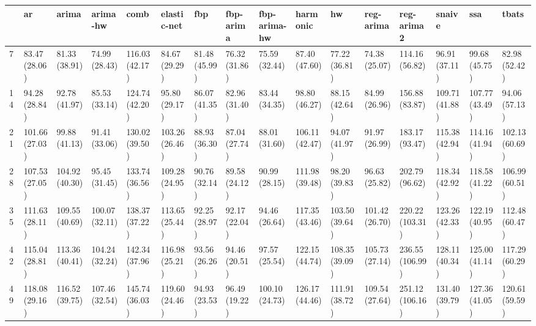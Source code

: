 \begin{tabular}{llllllllllllllll}
\toprule
{} &              ar &           arima &        arima-hw &            comb &     elastic-net &             fbp &       fbp-arima &    fbp-arima-hw &        harmonic &              hw &       reg-arima &       reg-arima2 &          snaive &             ssa &           tbats \\
\midrule
7   &   83.47 (28.06) &   81.33 (38.91) &   74.99 (28.43) &  116.03 (42.17) &   84.67 (29.29) &   81.48 (45.99) &   76.32 (31.86) &   75.59 (32.44) &   87.40 (47.60) &   77.22 (36.81) &   74.38 (25.07) &   114.16 (56.82) &   96.91 (37.11) &   99.68 (45.75) &   82.98 (52.42) \\
14  &   94.28 (28.84) &   92.78 (41.97) &   85.53 (33.14) &  124.74 (42.20) &   95.80 (29.17) &   86.07 (41.35) &   82.96 (31.40) &   83.44 (34.35) &   98.80 (46.27) &   88.15 (42.64) &   84.99 (26.96) &   156.88 (83.87) &  109.71 (41.88) &  107.77 (43.49) &   94.06 (57.13) \\
21  &  101.66 (27.03) &   99.88 (41.13) &   91.41 (33.06) &  130.02 (39.50) &  103.26 (26.46) &   88.93 (36.30) &   87.04 (27.74) &   88.01 (31.60) &  106.11 (42.47) &   94.07 (41.97) &   91.97 (26.99) &   183.17 (93.47) &  115.38 (42.94) &  114.16 (41.94) &  102.13 (60.69) \\
28  &  107.53 (27.05) &  104.92 (40.30) &   95.45 (31.45) &  133.74 (36.56) &  109.28 (24.95) &   90.76 (32.14) &   89.58 (24.12) &   90.99 (28.15) &  111.98 (39.48) &   98.20 (39.83) &   96.63 (25.82) &   202.79 (96.62) &  118.34 (42.92) &  118.58 (41.22) &  106.99 (60.51) \\
35  &  111.63 (28.11) &  109.55 (40.69) &  100.07 (32.11) &  138.37 (37.22) &  113.65 (25.44) &   92.25 (28.97) &   92.17 (22.04) &   94.46 (26.64) &  117.35 (43.46) &  103.50 (39.64) &  101.42 (26.70) &  220.22 (103.31) &  123.26 (42.33) &  122.19 (40.95) &  112.48 (60.47) \\
42  &  115.04 (28.81) &  113.36 (40.41) &  104.24 (32.24) &  142.34 (37.96) &  116.98 (25.21) &   93.56 (26.26) &   94.46 (20.51) &   97.57 (25.54) &  122.15 (44.74) &  108.35 (39.09) &  105.73 (27.14) &  236.55 (106.99) &  128.11 (40.34) &  125.00 (41.14) &  117.29 (60.29) \\
49  &  118.08 (29.16) &  116.52 (39.75) &  107.46 (32.54) &  145.74 (36.03) &  119.60 (24.46) &   94.93 (23.53) &   96.49 (19.22) &  100.10 (24.73) &  126.17 (44.46) &  111.91 (38.72) &  109.54 (27.64) &  251.12 (106.16) &  131.40 (39.79) &  127.36 (41.05) &  120.61 (59.59) \\

\end{tabular}
